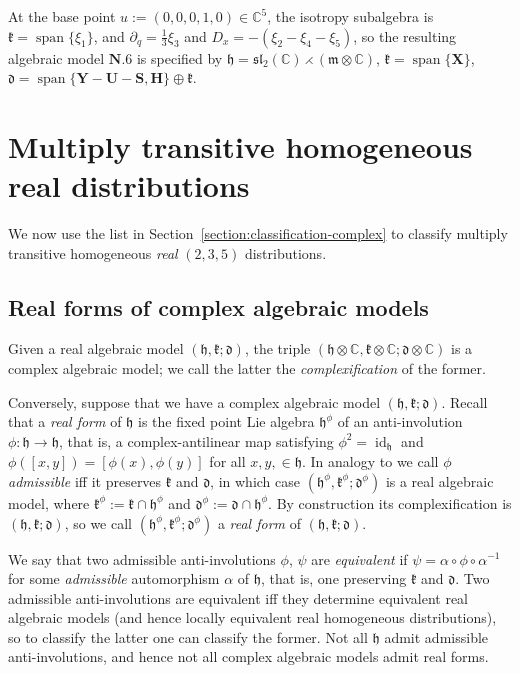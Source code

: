 \documentclass[10pt,a4paper]{amsart}
\DeclareMathOperator{\id} {id}
\DeclareMathOperator{\spanOperator}{span}
\newcommand{\Span}[1]{\spanOperator\{{#1}\}}
\newcommand{\bbC}{\mathbb{C}}
\newcommand{\mbH}{\mathbf{H}}
\newcommand{\mbS}{\mathbf{S}}
\newcommand{\mbU}{\mathbf{U}}
\newcommand{\mbX}{\mathbf{X}}
\newcommand{\mbY}{\mathbf{Y}}
\newcommand{\mfd} {\mathfrak{d}}
\newcommand{\mfh} {\mathfrak{h}}
\newcommand{\mfk} {\mathfrak{k}}
\newcommand{\mfm} {\mathfrak{m}}
\newcommand{\mfsl} {\mathfrak{sl}}
\numberwithin{equation}{section}
\begin{document}
\begin{Example}
At the base point $u := (0, 0, 0, 1, 0) \in \bbC^5$, the isotropy subalgebra is $\mfk = \Span{\xi_1}$, and $\partial_q = \frac{1}{3} \xi_3$ and $D_x = -(\xi_2 - \xi_4 - \xi_5)$, so the resulting algebraic model $\mathbf{N.6}$ is specified by $\mfh = \mfsl_2(\bbC) \rightthreetimes (\mfm \otimes \bbC)$, $\mfk = \Span{\mbX}$, $\mfd = \Span{\mbY - \mbU - \mbS, \mbH} \oplus \mfk$.
\end{Example}


\section{Multiply transitive homogeneous real distributions}\label{section:classification-real}

We now use the list in Section~\ref{section:classification-complex} to classify multiply transitive homogeneous \textit{real} $(2, 3, 5)$ distributions.

\subsection{Real forms of complex algebraic models}

Given a real algebraic model $(\mfh, \mfk; \mfd)$, the triple $(\mfh \otimes \bbC, \mfk \otimes \bbC; \mfd \otimes \bbC)$ is a complex algebraic model; we call the latter the \textit{complexification} of the former.

Conversely, suppose that we have a complex algebraic model $(\mfh, \mfk; \mfd)$. Recall that a \textit{real form} of $\mfh$ is the fixed point Lie algebra $\mfh^{\phi}$ of an anti-involution $\phi \colon \mfh \to \mfh$, that is, a complex-antilinear map satisfying $\phi^2 = \id_{\mfh}$ and $\phi([x, y]) = [\phi(x), \phi(y)]$ for all $x, y, \in \mfh$. In analogy to \cite[Section~3]{DMT} we call $\phi$ \textit{admissible} iff it preserves $\mfk$ and $\mfd$, in which case $(\mfh^{\phi}, \mfk^{\phi}; \mfd^{\phi})$ is a real algebraic model, where $\mfk^{\phi} := \mfk \cap \mfh^{\phi}$ and $\mfd^{\phi} := \mfd \cap \mfh^{\phi}$. By construction its complexification is $(\mfh, \mfk; \mfd)$, so we call $(\mfh^{\phi}, \mfk^{\phi}; \mfd^{\phi})$ a \textit{real form} of $(\mfh, \mfk; \mfd)$.

We say that two admissible anti-involutions $\phi$, $\psi$ are \textit{equivalent} if $\psi = \alpha \circ \phi \circ \alpha^{-1}$ for some \textit{admissible} automorphism $\alpha$ of $\mfh$, that is, one preserving $\mfk$ and $\mfd$. Two admissible anti-involutions are equivalent iff they determine equivalent real algebraic models (and hence locally equivalent real homogeneous distributions), so to classify the latter one can classify the former. Not all $\mfh$ admit admissible anti-involutions, and hence not all complex algebraic models admit real forms.
\end{document}
